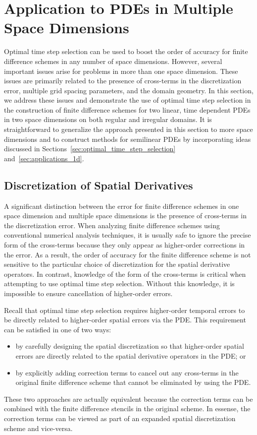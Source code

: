 \documentclass[oneeqnum,onefignum,onetabnum,onethmnum]{siamltex}
\begin{document}
\section{\label{sec:applications_multidim}
         Application to PDEs in Multiple Space Dimensions}
Optimal time step selection can be used to boost the order of accuracy for 
finite difference schemes in any number of space dimensions.  However, 
several important issues arise for problems in more than one space dimension.  
These issues are primarily related to the presence of cross-terms in the 
discretization error, multiple grid spacing parameters,  and the domain 
geometry.  In this section, we address these issues and demonstrate the use 
of optimal time step selection in the construction of finite difference 
schemes for two linear, time dependent PDEs in two space dimensions on both 
regular and irregular domains.  It is straightforward to generalize the 
approach presented in this section to more space dimensions and to construct 
methods for semilinear PDEs by incorporating ideas discussed in 
Sections~\ref{sec:optimal_time_step_selection} and~\ref{sec:applications_1d}.  


\subsection{\label{sec:ots_multidim_crossterms}
            Discretization of Spatial Derivatives}
A significant distinction between the error for finite difference schemes in 
one space dimension and multiple space dimensions is the presence of 
cross-terms in the discretization error.  When analyzing finite difference 
schemes using conventional numerical analysis techniques, it is usually safe 
to ignore the precise form of the cross-terms because they only appear as 
higher-order corrections in the error.  As a result, the order of accuracy for 
the finite difference scheme is not sensitive to the particular choice of 
discretization for the spatial derivative operators.  In contrast, knowledge 
of the form of the cross-terms is critical when attempting to use optimal time 
step selection.  Without this knowledge, it is impossible to ensure 
cancellation of higher-order errors.  

Recall that optimal time step selection requires higher-order temporal 
errors to be directly related to higher-order spatial errors via the PDE.  
This requirement can be satisfied in one of two ways:
\begin{itemize}
\item by carefully designing the spatial discretization so that 
      higher-order spatial errors are directly related to the spatial 
      derivative operators in the PDE; or
\item by explicitly adding correction terms to cancel out any cross-terms 
      in the original finite difference scheme that cannot be eliminated 
      by using the PDE.
\end{itemize}
These two approaches are actually equivalent because the correction terms 
can be combined with the finite difference stencils in the original scheme.  
In essense, the correction terms can be viewed as part of an expanded spatial 
discretization scheme and vice-versa.
\end{document}
